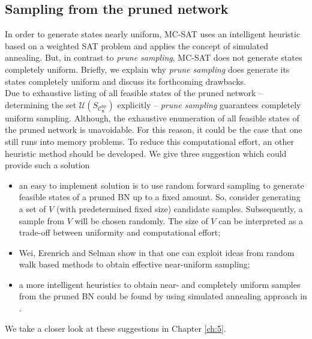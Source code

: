 \documentclass[a4paper, twoside, 11pt]{report}
\newcommand{\bfx}{{\mathbf{x}}}
\newcommand{\C}{{\mathcal C}}
\newcommand{\U}{{\mathcal{U}}}
\theoremstyle{plain}
\theoremstyle{definition}
\theoremstyle{remark}
\newcommand{\ps}{\textit{prune sampling }}
\begin{document}
\subsection{Sampling from the pruned network}\label{sec:sampling_uni}
In order to generate states nearly uniform, MC-SAT uses an intelligent heuristic \cite{wei2004towards} based on a weighted SAT problem and applies the concept of simulated annealing. But, in contrast to \textit{prune sampling}, MC-SAT does not generate states completely uniform. Briefly, we explain why \ps does generate its states completely uniform and discuss its forthcoming drawbacks.\\

Due to exhaustive listing of all feasible states of the pruned network -- determining the set $\U(S_{\C_\bfx^{\text{np}}})$ explicitly -- \ps guarantees completely uniform sampling. Although, the exhaustive enumeration of all feasible states of the pruned network is unavoidable. For this reason, it could be the case that one still runs into memory problems. To reduce this computational effort, an other heuristic method should be developed. We give three suggestion which could provide such a solution
\begin{itemize}
\item an easy to implement solution is to use random forward sampling to generate feasible states of a pruned BN up to a fixed amount. So, consider generating a set of $V$ (with predetermined fixed size) candidate samples. Subsequently, a sample from $V$ will be chosen randomly. The size of $V$ can be interpreted as a trade-off between uniformity and computational effort;
\item Wei, Erenrich and Selman show in \cite{wei2004towards} that one can exploit ideas from random walk based methods to obtain effective near-uniform sampling;
\item a more intelligent heuristics to obtain near- and completely uniform samples from the pruned BN could be found by using simulated annealing approach in \cite{wei2004towards}.
\end{itemize}
We take a closer look at these suggestions in Chapter \ref{ch:5}.

\end{document}
